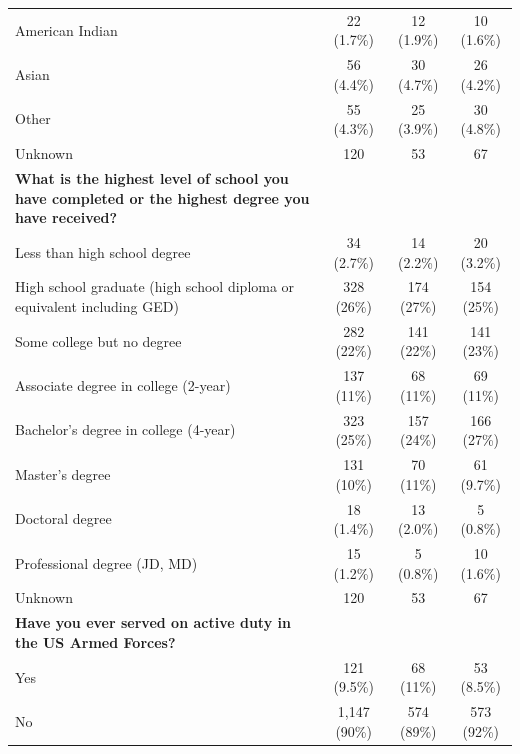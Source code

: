 \documentclass[
  11pt,
  a4paper,
]{article}
\begin{document}
\begin{longtable}[l]{lccc}
\addlinespace
\hspace{1em}American Indian & 22 (1.7\%) & 12 (1.9\%) & 10 (1.6\%)\\
\hspace{1em}Asian & 56 (4.4\%) & 30 (4.7\%) & 26 (4.2\%)\\
\hspace{1em}Other & 55 (4.3\%) & 25 (3.9\%) & 30 (4.8\%)\\
\hspace{1em}Unknown & 120 & 53 & \vphantom{3} 67\\
\textbf{What is the highest level of school you have completed or the highest degree you have received?} &  &  & \\
\addlinespace
\hspace{1em}Less than high school degree & 34 (2.7\%) & 14 (2.2\%) & 20 (3.2\%)\\
\hspace{1em}High school graduate (high school diploma or equivalent including GED) & 328 (26\%) & 174 (27\%) & 154 (25\%)\\
\hspace{1em}Some college but no degree & 282 (22\%) & 141 (22\%) & 141 (23\%)\\
\hspace{1em}Associate degree in college (2-year) & 137 (11\%) & 68 (11\%) & 69 (11\%)\\
\hspace{1em}Bachelor's degree in college (4-year) & 323 (25\%) & 157 (24\%) & 166 (27\%)\\
\addlinespace
\hspace{1em}Master's degree & 131 (10\%) & 70 (11\%) & 61 (9.7\%)\\
\hspace{1em}Doctoral degree & 18 (1.4\%) & 13 (2.0\%) & 5 (0.8\%)\\
\hspace{1em}Professional degree (JD, MD) & 15 (1.2\%) & 5 (0.8\%) & 10 (1.6\%)\\
\hspace{1em}Unknown & 120 & 53 & \vphantom{2} 67\\
\textbf{Have you ever served on active duty in the US Armed Forces?} &  &  & \\
\addlinespace
\hspace{1em}Yes & 121 (9.5\%) & 68 (11\%) & 53 (8.5\%)\\
\hspace{1em}No & 1,147 (90\%) & 574 (89\%) & 573 (92\%)\\

\end{longtable}
\end{document}
